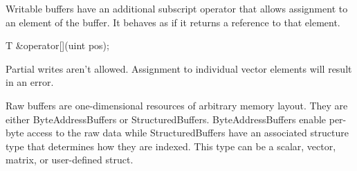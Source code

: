 Writable buffers have an additional subscript operator that allows assignment to an element of the buffer.
It behaves as if it returns a reference to that element.
\begin{HLSL}
 T &operator[](uint pos);
\end{HLSL}

Partial writes aren't allowed.
Assignment to individual vector elements will result in an error.


Raw buffers are one-dimensional resources of arbitrary memory layout.
They are either ByteAddressBuffers or StructuredBuffers.
ByteAddressBuffers enable per-byte access to the raw data while
StructuredBuffers have an associated structure type that determines how they are
indexed. This type can be a scalar, vector, matrix, or user-defined struct.


